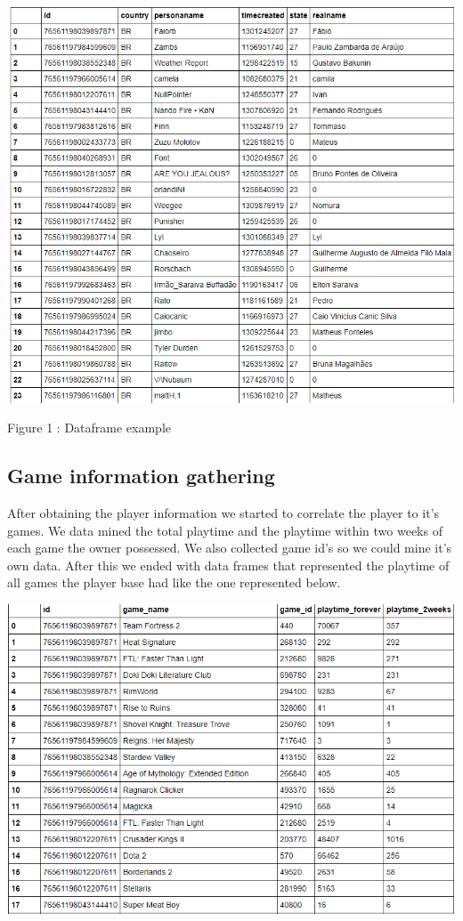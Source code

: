 \documentclass[review]{elsarticle}
\begin{document}
\includegraphics[width=\textwidth]{dataframe.png}

{Figure 1 : Dataframe example}

\subsection{Game information gathering}
After obtaining the player information we started to correlate the player to it's games. We data mined the total playtime and the playtime within two weeks of each game the owner possessed. We also collected game id's so we could mine it's own data. After this we ended with data frames that represented the playtime of all games the player base had like the one represented below.

\includegraphics[width=\textwidth]{dataframe2.png}
\end{document}
